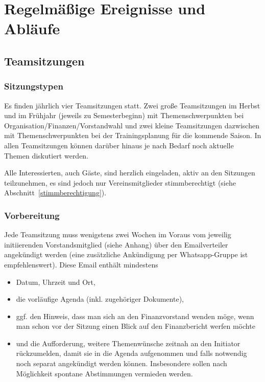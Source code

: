 \documentclass[a4 paper, 11pt]{article}
\begin{document}
\section{Regelmäßige Ereignisse und Abläufe} \label{regelmaessig}

\subsection{Teamsitzungen} \label{teamsitzungen}
\subsubsection{Sitzungstypen}
Es finden jährlich vier Teamsitzungen statt. Zwei große Teamsitzungen im Herbst und im Frühjahr (jeweils zu Semesterbeginn) mit Themenschwerpunkten bei Organisation/Finanzen/Vorstandwahl und zwei kleine Teamsitzungen dazwischen mit Themenschwerpunkten bei der Trainingsplanung für die kommende Saison. In allen Teamsitzungen können darüber hinaus je nach Bedarf noch aktuelle Themen diskutiert werden. 

Alle Interessierten, auch Gäste, sind herzlich eingeladen, aktiv an den Sitzungen teilzunehmen, es sind jedoch nur Vereinsmitglieder stimmberechtigt (siehe Abschnitt~\ref{stimmberechtigung}).

\subsubsection{Vorbereitung}
Jede Teamsitzung muss wenigstens zwei Wochen im Voraus vom jeweilig initiierenden Vorstandsmitglied (siehe Anhang) über den Emailverteiler angekündigt werden (eine zusätzliche Ankündigung per Whatsapp-Gruppe ist empfehlenswert). Diese Email enthält mindestens
\begin{itemize}
	\item Datum, Uhrzeit und Ort,
	\item die vorläufige Agenda (inkl. zugehöriger Dokumente),
	\item ggf. den Hinweis, dass man sich an den Finanzvorstand wenden möge, wenn man schon vor der Sitzung einen Blick auf den Finanzbericht werfen möchte
	\item und die Aufforderung, weitere Themenwünsche zeitnah an den Initiator rückzumelden, damit sie in die Agenda aufgenommen und falls notwendig noch separat angekündigt werden können. Insbesondere sollen nach Möglichkeit spontane Abstimmungen vermieden werden.
\end{itemize}
\end{document}
